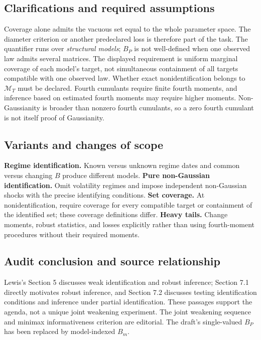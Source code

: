 \documentclass[11pt,a4paper]{article}
\begin{document}
\subsection*{Clarifications and required assumptions}

Coverage alone admits the vacuous set equal to the whole parameter space. The diameter criterion or another predeclared loss is therefore part of the task. The quantifier runs over \emph{structural models}; $B_P$ is not well-defined when one observed law admits several matrices. The displayed requirement is uniform marginal coverage of each model's target, not simultaneous containment of all targets compatible with one observed law. Whether exact nonidentification belongs to $\mathcal M_T$ must be declared. Fourth cumulants require finite fourth moments, and inference based on estimated fourth moments may require higher moments. Non-Gaussianity is broader than nonzero fourth cumulants, so a zero fourth cumulant is not itself proof of Gaussianity.

\subsection*{Variants and changes of scope}

\textbf{Regime identification.} Known versus unknown regime dates and common versus changing $B$ produce different models. \textbf{Pure non-Gaussian identification.} Omit volatility regimes and impose independent non-Gaussian shocks with the precise identifying conditions. \textbf{Set coverage.} At nonidentification, require coverage for every compatible target or containment of the identified set; these coverage definitions differ. \textbf{Heavy tails.} Change moments, robust statistics, and losses explicitly rather than using fourth-moment procedures without their required moments.

\subsection*{Audit conclusion and source relationship}

Lewis's Section 5 discusses weak identification and robust inference; Section 7.1 directly motivates robust inference, and Section 7.2 discusses testing identification conditions and inference under partial identification. These passages support the agenda, not a unique joint weakening experiment. The joint weakening sequence and minimax informativeness criterion are editorial. The draft's single-valued $B_P$ has been replaced by model-indexed $B_m$.
\end{document}
